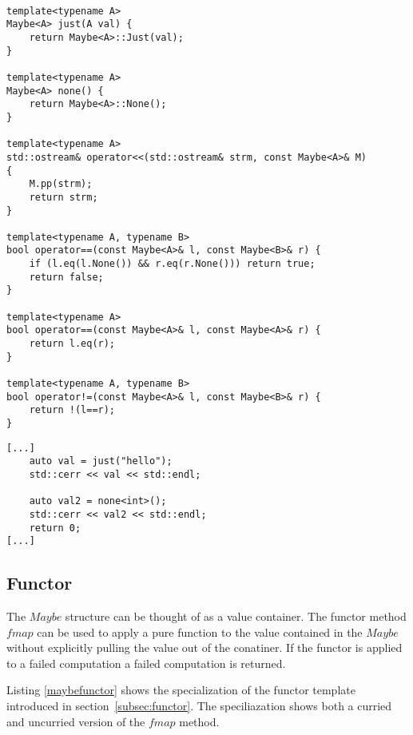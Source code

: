 \documentclass[12pt,fleqn]{article}
\begin{document}
%
%
\begin{minipage}{\linewidth}
\begin{lstlisting}[caption=auxilliary function for the Maybe class, label=maybeaux]

template<typename A>
Maybe<A> just(A val) {
	return Maybe<A>::Just(val);
}

template<typename A>
Maybe<A> none() {
	return Maybe<A>::None();
}

template<typename A>
std::ostream& operator<<(std::ostream& strm, const Maybe<A>& M) 
{
	M.pp(strm);
	return strm;
}

template<typename A, typename B>
bool operator==(const Maybe<A>& l, const Maybe<B>& r) {
	if (l.eq(l.None()) && r.eq(r.None())) return true;
	return false;
}

template<typename A>
bool operator==(const Maybe<A>& l, const Maybe<A>& r) {
	return l.eq(r);
}

template<typename A, typename B>
bool operator!=(const Maybe<A>& l, const Maybe<B>& r) {
	return !(l==r);
}

\end{lstlisting}
\end{minipage}
%
%
%


%
%
\begin{minipage}{\linewidth}
\begin{lstlisting}[caption=Example of the use of Maybe, label=maybeexample]
[...]
	auto val = just("hello");
	std::cerr << val << std::endl;

	auto val2 = none<int>();
	std::cerr << val2 << std::endl;
	return 0;
[...]
\end{lstlisting}
\end{minipage}
%
%
%
%
%
%
%
\subsection{Functor}
%
%

The $Maybe$ structure can be thought of as a value container.
The functor method $fmap$ can be used to apply a pure function to the value contained in the $Maybe$ 
without explicitly pulling the value out of the conatiner.
If the functor is applied to a failed computation a failed computation is returned.

Listing \ref{maybefunctor} shows the specialization of the functor template introduced in section~\ref{subsec:functor}.
The speciliazation shows both a curried and uncurried version of the $fmap$ method.
\end{document}
